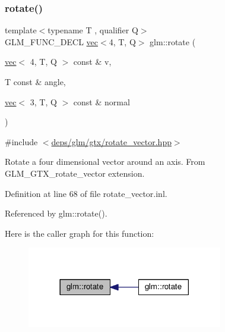 \subsubsection{\texorpdfstring{rotate()}{rotate()}\hspace{0.1cm}{\footnotesize\ttfamily [3/3]}}
{\footnotesize\ttfamily template$<$typename T , qualifier Q$>$ \\
G\+L\+M\+\_\+\+F\+U\+N\+C\+\_\+\+D\+E\+CL \hyperlink{structglm_1_1vec}{vec}$<$4, T, Q$>$ glm\+::rotate (\begin{DoxyParamCaption}\item[{\hyperlink{structglm_1_1vec}{vec}$<$ 4, T, Q $>$ const \&}]{v,  }\item[{T const \&}]{angle,  }\item[{\hyperlink{structglm_1_1vec}{vec}$<$ 3, T, Q $>$ const \&}]{normal }\end{DoxyParamCaption})}



{\ttfamily \#include $<$\hyperlink{rotate__vector_8hpp}{deps/glm/gtx/rotate\+\_\+vector.\+hpp}$>$}

Rotate a four dimensional vector around an axis. From G\+L\+M\+\_\+\+G\+T\+X\+\_\+rotate\+\_\+vector extension. 

Definition at line 68 of file rotate\+\_\+vector.\+inl.



Referenced by glm\+::rotate().

Here is the caller graph for this function\+:
\nopagebreak
\begin{figure}[H]
\begin{center}
\leavevmode
\includegraphics[width=242pt]{df/d02/group__gtx__rotate__vector_ga1005f1267ed9c57faa3f24cf6873b961_icgraph}
\end{center}
\end{figure}
\mbox{\label{group__gtx__rotate__vector_ga059fdbdba4cca35cdff172a9d0d0afc9}} 
